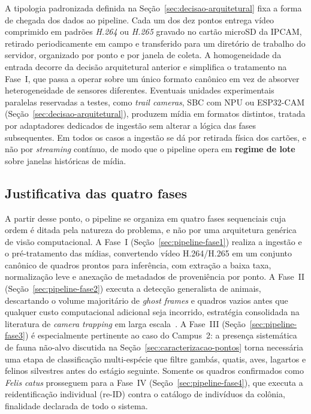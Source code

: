 A tipologia padronizada definida na Seção~\ref{sec:decisao-arquitetural} fixa a forma de chegada dos dados ao pipeline. Cada um dos dez pontos entrega vídeo comprimido em padrões \textit{H.264} ou \textit{H.265} gravado no cartão microSD da IPCAM, retirado periodicamente em campo e transferido para um diretório de trabalho do servidor, organizado por ponto e por janela de coleta. A homogeneidade da entrada decorre da decisão arquitetural anterior e simplifica o tratamento na Fase~I, que passa a operar sobre um único formato canônico em vez de absorver heterogeneidade de sensores diferentes. Eventuais unidades experimentais paralelas reservadas a testes, como \textit{trail cameras}, SBC com NPU ou ESP32-CAM (Seção~\ref{sec:decisao-arquitetural}), produzem mídia em formatos distintos, tratada por adaptadores dedicados de ingestão sem alterar a lógica das fases subsequentes. Em todos os casos a ingestão se dá por retirada física dos cartões, e não por \textit{streaming} contínuo, de modo que o pipeline opera em \textbf{regime de lote} sobre janelas históricas de mídia.

\subsection*{Justificativa das quatro fases}

A partir desse ponto, o pipeline se organiza em quatro fases sequenciais cuja ordem é ditada pela natureza do problema, e não por uma arquitetura genérica de visão computacional. A Fase~I (Seção~\ref{sec:pipeline-fase1}) realiza a ingestão e o pré-tratamento das mídias, convertendo vídeo H.264/H.265 em um conjunto canônico de quadros prontos para inferência, com extração a baixa taxa, normalização leve e anexação de metadados de proveniência por ponto. A Fase~II (Seção~\ref{sec:pipeline-fase2}) executa a detecção generalista de animais, descartando o volume majoritário de \textit{ghost frames} e quadros vazios antes que qualquer custo computacional adicional seja incorrido, estratégia consolidada na literatura de \textit{camera trapping} em larga escala~\cite{bruce2025largescale,velasco2024smartcameratraps,mulero2025addressing}. A Fase~III (Seção~\ref{sec:pipeline-fase3}) é especialmente pertinente ao caso do Campus~2: a presença sistemática de fauna não-alvo discutida na Seção~\ref{sec:caracterizacao-pontos} torna necessária uma etapa de classificação multi-espécie que filtre gambás, quatis, aves, lagartos e felinos silvestres antes do estágio seguinte. Somente os quadros confirmados como \textit{Felis catus} prosseguem para a Fase~IV (Seção~\ref{sec:pipeline-fase4}), que executa a reidentificação individual (re-ID) contra o catálogo de indivíduos da colônia, finalidade declarada de todo o sistema.

